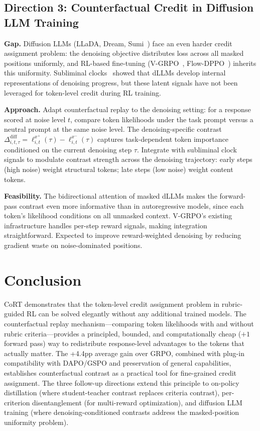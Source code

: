 \documentclass[11pt,a4paper]{article}
\begin{document}
\subsection{Direction 3: Counterfactual Credit in Diffusion LLM Training}

\textbf{Gap.} Diffusion LLMs (LLaDA, Dream, Sumi~\cite{sumi2026}) face an even harder credit assignment problem: the denoising objective distributes loss across all masked positions uniformly, and RL-based fine-tuning (V-GRPO~\cite{vgrpo2026}, Flow-DPPO~\cite{flowdppo2026}) inherits this uniformity. Subliminal clocks~\cite{subliminalclocks2026} showed that dLLMs develop internal representations of denoising progress, but these latent signals have not been leveraged for token-level credit during RL training.

\textbf{Approach.} Adapt counterfactual replay to the denoising setting: for a response scored at noise level $t$, compare token likelihoods under the task prompt versus a neutral prompt at the same noise level. The denoising-specific contrast $\Delta^{\text{diff}}_{i,t,\tau} = \ell^{x^+}_{i,t}(\tau) - \ell^{x^-}_{i,t}(\tau)$ captures task-dependent token importance conditioned on the current denoising step $\tau$. Integrate with subliminal clock signals to modulate contrast strength across the denoising trajectory: early steps (high noise) weight structural tokens; late steps (low noise) weight content tokens.

\textbf{Feasibility.} The bidirectional attention of masked dLLMs makes the forward-pass contrast even more informative than in autoregressive models, since each token's likelihood conditions on all unmasked context. V-GRPO's existing infrastructure handles per-step reward signals, making integration straightforward. Expected to improve reward-weighted denoising by reducing gradient waste on noise-dominated positions.

\section{Conclusion}
CoRT demonstrates that the token-level credit assignment problem in rubric-guided RL can be solved elegantly without any additional trained models. The counterfactual replay mechanism---comparing token likelihoods with and without rubric criteria---provides a principled, bounded, and computationally cheap ($+1$ forward pass) way to redistribute response-level advantages to the tokens that actually matter. The +4.4pp average gain over GRPO, combined with plug-in compatibility with DAPO/GSPO and preservation of general capabilities, establishes counterfactual contrast as a practical tool for fine-grained credit assignment. The three follow-up directions extend this principle to on-policy distillation (where student-teacher contrast replaces criteria contrast), per-criterion disentanglement (for multi-reward optimization), and diffusion LLM training (where denoising-conditioned contrasts address the masked-position uniformity problem).
\end{document}
